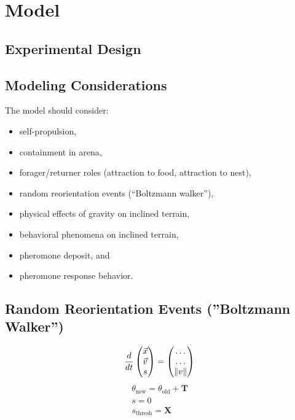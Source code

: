 \section{Model}

\subsection{Experimental Design}



\subsection{Modeling Considerations}

The model should consider:
	\begin{itemize}
    	\item self-propulsion,
        \item containment in arena,
        \item forager/returner roles (attraction to food, attraction to nest),
        \item random reorientation events (``Boltzmann walker''),
        \item physical effects of gravity on inclined terrain,
        \item behavioral phenomena on inclined terrain,
        \item pheromone deposit, and
        \item pheromone response behavior.
    \end{itemize}


\subsection{Random Reorientation Events (''Boltzmann Walker'')}

\begin{align*}
\frac{d}{dt} \begin{pmatrix}\vec{x}\\\vec{v}\\s\end{pmatrix} = \begin{pmatrix}\ldots \\ \ldots\\ \lVert v\rVert\end{pmatrix}
\end{align*}
\begin{align*}
\theta_{\operatorname{new}} = \theta_{\operatorname{old}} + \bm{T} \\
s = 0 \\
s_{\operatorname{thresh}} = \bm{X}
\end{align*}


